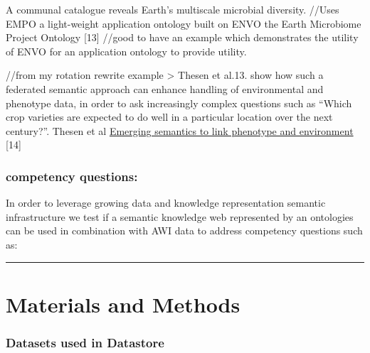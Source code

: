 \documentclass[]{article}
\begin{document}
A communal catalogue reveals Earth's multiscale microbial diversity.
//Uses EMPO a light-weight application ontology built on ENVO the Earth
Microbiome Project Ontology {[}13{]} //good to have an example which
demonstrates the utility of ENVO for an application ontology to provide
utility.

//from my rotation rewrite example \textgreater{} Thesen et al.13. show
how such a federated semantic approach can enhance handling of
environmental and phenotype data, in order to ask increasingly complex
questions such as ``Which crop varieties are expected to do well in a
particular location over the next century?''. Thesen et al
\href{https://www.ncbi.nlm.nih.gov/pmc/articles/PMC4690371/}{Emerging
semantics to link phenotype and environment} {[}14{]}

\hypertarget{competency-questions}{%
\subsubsection{competency questions:}\label{competency-questions}}

In order to leverage growing data and knowledge representation semantic
infrastructure we test if a semantic knowledge web represented by an
ontologies can be used in combination with AWI data to address
competency questions such as:

\begin{center}\rule{0.5\linewidth}{\linethickness}\end{center}

\hypertarget{materials-and-methods}{%
\section{Materials and Methods}\label{materials-and-methods}}

\hypertarget{datasets-used-in-datastore}{%
\subsubsection{Datasets used in
Datastore}\label{datasets-used-in-datastore}}
\end{document}
